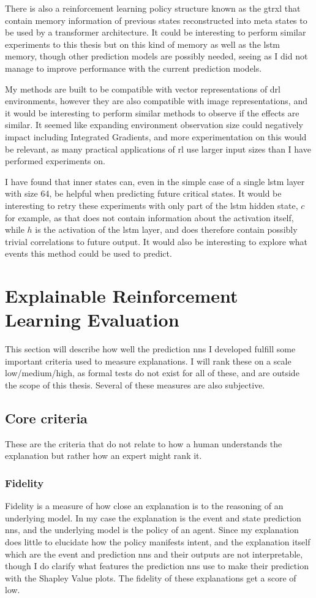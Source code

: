 \documentclass[UKenglish]{uiomasterthesis}
\begin{document}
There is also a reinforcement learning policy structure known as the \ac{gtrxl} that contain memory information of previous states reconstructed into meta states to be used by a transformer architecture. It could be interesting to perform similar experiments to this thesis but on this kind of memory as well as the lstm memory, though other prediction models are possibly needed, seeing as I did not manage to improve performance with the current prediction models.

My methods are built to be compatible with vector representations of \ac{drl} environments, however they are also compatible with image representations, and it would be interesting to perform similar methods to observe if the effects are similar. It seemed like expanding environment observation size could negatively impact including Integrated Gradients, and more experimentation on this would be relevant, as many practical applications of \ac{rl} use larger input sizes than I have performed experiments on.

I have found that inner states can, even in the simple case of a single lstm layer with size 64, be helpful when predicting future critical states. It would be interesting to retry these experiments with only part of the \ac{lstm} hidden state, $c$ for example, as that does not contain information about the activation itself, while $h$ is the activation of the \ac{lstm} layer, and does therefore contain possibly trivial correlations to future output. It would also be interesting to explore what events this method could be used to predict.

\section{Explainable Reinforcement Learning Evaluation}
This section will describe how well the prediction \acp{nn} I developed fulfill some important criteria used to measure explanations. I will rank these on a scale low/medium/high, as formal tests do not exist for all of these, and are outside the scope of this thesis. Several of these measures are also subjective.

\subsection{Core criteria}
These are the criteria that do not relate to how a human understands the explanation but rather how an expert might rank it.

\subsubsection{Fidelity}
Fidelity is a measure of how close an explanation is to the reasoning of an underlying model. In my case the explanation is the event and state prediction \acp{nn}, and the underlying model is the policy of an agent. Since my explanation does little to elucidate how the policy manifests intent, and the explanation itself which are the event and prediction \acp{nn} and their outputs are not interpretable, though I do clarify what features the prediction \acp{nn} use to make their prediction with the Shapley Value plots. The fidelity of these explanations get a score of low.
\end{document}
